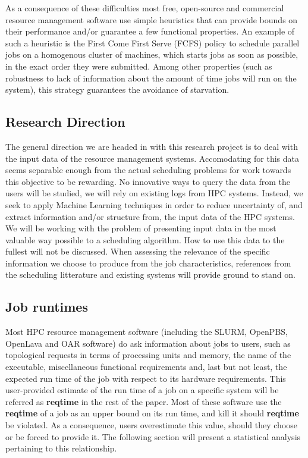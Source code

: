 \documentclass{article}
\begin{document}
As a consequence of these difficulties most free, open-source and commercial resource management software use simple heuristics that can provide bounds on their performance and/or guarantee a few functional properties.
An example of such a heuristic is the First Come First Serve (FCFS) policy to schedule parallel jobs on a homogenous cluster of machines, which starts jobs as soon as possible, in the exact order they were submitted.
Among other properties (such as robustness to lack of information about the amount of time jobs will run on the system), this strategy guarantees the avoidance of starvation.

\subsection{Research Direction}
The general direction we are headed in with this research project is to deal with the input data of the resource management systems.
Accomodating for this data seems separable enough from the actual scheduling problems for work towards this objective to be rewarding.
No innovative ways to query the data from the users will be studied, we will rely on existing logs from HPC systems. Instead, we seek to apply Machine Learning techniques in order to reduce uncertainty of, and extract information and/or structure from, the input data of the HPC systems.
We will be working with the problem of presenting input data in the most valuable way possible to a scheduling algorithm. How to use this data to the fullest will not be discussed.
When assessing the relevance of the specific information we choose to produce from the job characteristics, references from the scheduling litterature and existing systems will provide ground to stand on.

\subsection{Job runtimes}
Most HPC resource management software (including the SLURM, OpenPBS, OpenLava and OAR software) do ask information about jobs to users, such as topological requests in terms of processing units and memory, the name of the executable, miscellaneous functional requirements and, last but not least, the expected run time of the job with respect to its hardware requirements.
This user-provided estimate of the run time of a job on a specific system will be referred as \textbf{reqtime} in the rest of the paper. Most of these software use the \textbf{reqtime} of a job as an upper bound on its run time, and kill it should \textbf{reqtime} be violated. As a consequence, users overestimate this value, should they choose or be forced to provide it. The following section will present a statistical analysis pertaining to this relationship.
\end{document}
